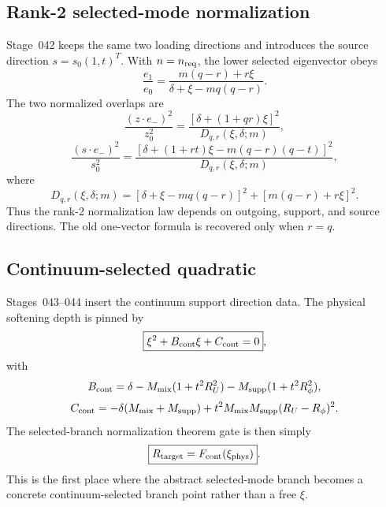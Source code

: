 \subsection{Rank-2 selected-mode normalization}
\label{subsec:part03-rank2-normalization}

Stage~042 keeps the same two loading directions and introduces the source direction \(s=s_0(1,t)^T\).  With \(n=n_{\rm req}\), the lower selected eigenvector obeys
\begin{equation}
\label{eq:part03-rank2-eigenvector}
\frac{e_1}{e_0}
=\frac{m(q-r)+r\xi}{\delta+
\xi-mq(q-r)}.
\end{equation}
The two normalized overlaps are
\begin{equation}
\label{eq:part03-z-overlap-rank2}
\frac{(z\cdot e_-)^2}{z_0^2}
=\frac{\left[\delta+(1+qr)\xi\right]^2}{D_{q,r}(\xi,\delta;m)},
\end{equation}
\begin{equation}
\label{eq:part03-s-overlap-rank2}
\frac{(s\cdot e_-)^2}{s_0^2}
=\frac{\left[\delta+(1+rt)\xi-m(q-r)(q-t)\right]^2}{D_{q,r}(\xi,\delta;m)},
\end{equation}
where
\begin{equation}
\label{eq:part03-Dqr}
D_{q,r}(\xi,\delta;m)=
\left[\delta+\xi-mq(q-r)\right]^2+
\left[m(q-r)+r\xi\right]^2.
\end{equation}
Thus the rank-2 normalization law depends on outgoing, support, and source directions.  The old one-vector formula is recovered only when \(r=q\).

\subsection{Continuum-selected quadratic}
\label{subsec:part03-continuum-selected-quadratic}

Stages~043--044 insert the continuum support direction data.  The physical softening depth is pinned by
\begin{equation}
\label{eq:part03-cont-quadratic}
\boxed{
\xi^2+B_{\rm cont}\xi+C_{\rm cont}=0},
\end{equation}
with
\begin{equation}
\label{eq:part03-Bcont-Ccont}
B_{\rm cont}=
\delta-M_{\rm mix}(1+t^2R_U^2)-M_{\rm supp}(1+t^2R_\phi^2),
\end{equation}
\begin{equation}
\label{eq:part03-Ccont}
C_{\rm cont}=
-\delta(M_{\rm mix}+M_{\rm supp})
+t^2M_{\rm mix}M_{\rm supp}(R_U-R_\phi)^2.
\end{equation}
The selected-branch normalization theorem gate is then simply
\begin{equation}
\label{eq:part03-cont-selected-gate}
\boxed{
R_{\rm target}=F_{\rm cont}(\xi_{\rm phys})}.
\end{equation}
This is the first place where the abstract selected-mode branch becomes a concrete continuum-selected branch point rather than a free \(\xi\).

